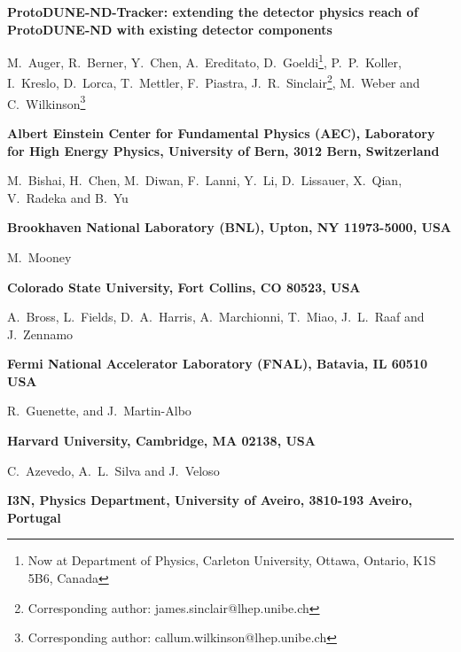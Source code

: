 \documentclass[a4paper]{article}
\begin{document}
\begin{center}
		
	{\Large \bf ProtoDUNE-ND-Tracker: extending the detector physics reach of ProtoDUNE-ND with existing detector components} 
	\vspace*{0.5cm}
	\setcounter{footnote}{0}  
	\def\A{\kern+.6ex\lower.42ex\hbox{$\scriptstyle \iota$}\kern-1.20ex a}
	\def\E{\kern+.5ex\lower.42ex\hbox{$\scriptstyle \iota$}\kern-1.10ex e}
	\small
	\newcommand{\Aname}[2]{#1}
	\def\titlefoot#1{\vspace{-0.3cm}\begin{center}{\bf #1}\end{center}}
	
	\Aname{M.~Auger}{Bern},
	\Aname{R.~Berner}{Bern},
	\Aname{Y.~Chen}{Bern},
	\Aname{A.~Ereditato}{Bern},
	\Aname{D.~Goeldi\footnote{Now at Department of Physics, Carleton University, Ottawa, Ontario, K1S 5B6, Canada}}{Bern},
	\Aname{P.~P.~Koller}{Bern},
	\Aname{I.~Kreslo}{Bern},
	\Aname{D.~Lorca}{Bern},
	\Aname{T.~Mettler}{Bern},
	\Aname{F.~Piastra}{Bern},
	\Aname{J.~R.~Sinclair\footnote{Corresponding author: james.sinclair@lhep.unibe.ch}}{Bern},
	\Aname{M.~Weber}{Bern} and
	\Aname{C.~Wilkinson\footnote{Corresponding author: callum.wilkinson@lhep.unibe.ch}}{Bern}
	\titlefoot{Albert Einstein Center for Fundamental Physics (AEC), Laboratory for High Energy Physics, University of Bern, 3012 Bern, Switzerland\label{Bern}}
	
	\Aname{M.~Bishai}{BNL},
	\Aname{H.~Chen}{BNL},
	\Aname{M.~Diwan}{BNL},
	\Aname{F.~Lanni}{BNL},
	\Aname{Y.~Li}{BNL},
	\Aname{D.~Lissauer}{BNL},
	\Aname{X.~Qian}{BNL},
	\Aname{V.~Radeka}{BNL} and
	\Aname{B.~Yu}{BNL}
	\titlefoot{Brookhaven National Laboratory (BNL), Upton, NY 11973-5000, USA\label{BNL}}
	
	\Aname{M.~Mooney}{Colorado}
	\titlefoot{Colorado State University, Fort Collins, CO 80523, USA\label{colorado}}
	
	\Aname{A.~Bross}{FNAL},
	\Aname{L.~Fields}{FNAL},
	\Aname{D.~A.~Harris}{FNAL},
	\Aname{A.~Marchionni}{FNAL},
	\Aname{T.~Miao}{FNAL},
	\Aname{J.~L.~Raaf}{FNAL} and
	\Aname{J.~Zennamo}{FNAL}
	\titlefoot{Fermi National Accelerator Laboratory (FNAL), Batavia, IL 60510 USA\label{FNAL}}
	
	\Aname{R.~Guenette}{Harvard}, and
	\Aname{J.~Martin-Albo}{Harvard}
	\titlefoot{Harvard University, Cambridge, MA 02138, USA\label{Harvard}}
	
	\Aname{C.~Azevedo}{I3N},
	\Aname{A.~L.~Silva}{I3N} and
	\Aname{J.~Veloso}{I3N}
	\titlefoot{I3N, Physics Department, University of Aveiro, 3810-193 Aveiro, Portugal\label{I3N}}
	

\end{center}
\end{document}

